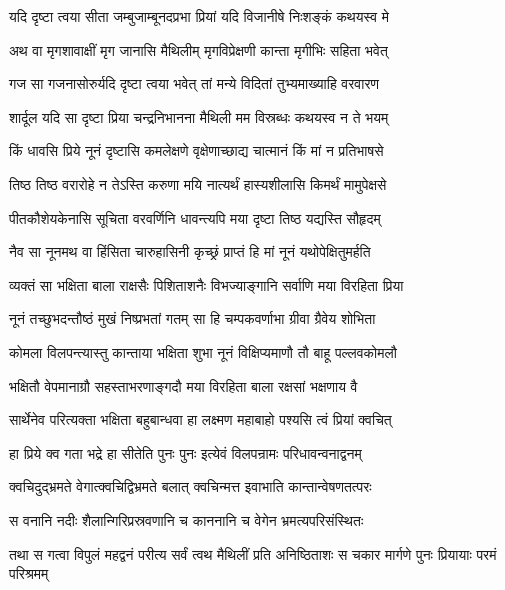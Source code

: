 \twolineshloka
{यदि दृष्टा त्वया सीता जम्बुजाम्बूनदप्रभा}
{प्रियां यदि विजानीषे निःशङ्कं कथयस्व मे} %

\twolineshloka
{अथ वा मृगशावाक्षीं मृग जानासि मैथिलीम्}
{मृगविप्रेक्षणी कान्ता मृगीभिः सहिता भवेत्} %

\twolineshloka
{गज सा गजनासोरुर्यदि दृष्टा त्वया भवेत्}
{तां मन्ये विदितां तुभ्यमाख्याहि वरवारण} %

\twolineshloka
{शार्दूल यदि सा दृष्टा प्रिया चन्द्रनिभानना}
{मैथिली मम विस्रब्धः कथयस्व न ते भयम्} %

\twolineshloka
{किं धावसि प्रिये नूनं दृष्टासि कमलेक्षणे}
{वृक्षेणाच्छाद्य चात्मानं किं मां न प्रतिभाषसे} %

\twolineshloka
{तिष्ठ तिष्ठ वरारोहे न तेऽस्ति करुणा मयि}
{नात्यर्थं हास्यशीलासि किमर्थं मामुपेक्षसे} %

\twolineshloka
{पीतकौशेयकेनासि सूचिता वरवर्णिनि}
{धावन्त्यपि मया दृष्टा तिष्ठ यद्यस्ति सौहृदम्} %

\twolineshloka
{नैव सा नूनमथ वा हिंसिता चारुहासिनी}
{कृच्छ्रं प्राप्तं हि मां नूनं यथोपेक्षितुमर्हति} %

\twolineshloka
{व्यक्तं सा भक्षिता बाला राक्षसैः पिशिताशनैः}
{विभज्याङ्गानि सर्वाणि मया विरहिता प्रिया} %

\twolineshloka
{नूनं तच्छुभदन्तौष्ठं मुखं निष्प्रभतां गतम्}
{सा हि चम्पकवर्णाभा ग्रीवा ग्रैवेय शोभिता} %

\twolineshloka
{कोमला विलपन्त्यास्तु कान्ताया भक्षिता शुभा}
{नूनं विक्षिप्यमाणौ तौ बाहू पल्लवकोमलौ} %

\twolineshloka
{भक्षितौ वेपमानाग्रौ सहस्ताभरणाङ्गदौ}
{मया विरहिता बाला रक्षसां भक्षणाय वै} %

\twolineshloka
{सार्थेनेव परित्यक्ता भक्षिता बहुबान्धवा}
{हा लक्ष्मण महाबाहो पश्यसि त्वं प्रियां क्वचित्} %

\twolineshloka
{हा प्रिये क्व गता भद्रे हा सीतेति पुनः पुनः}
{इत्येवं विलपन्रामः परिधावन्वनाद्वनम्} %

\twolineshloka
{क्वचिदुद्भ्रमते वेगात्क्वचिद्विभ्रमते बलात्}
{क्वचिन्मत्त इवाभाति कान्तान्वेषणतत्परः} %

\twolineshloka
{स वनानि नदीः शैलान्गिरिप्रस्रवणानि च}
{काननानि च वेगेन भ्रमत्यपरिसंस्थितः} %

\fourlineindentedshloka
{तथा स गत्वा विपुलं महद्वनं}
{ परीत्य सर्वं त्वथ मैथिलीं प्रति}
{अनिष्ठिताशः स चकार मार्गणे}
{ पुनः प्रियायाः परमं परिश्रमम्} %



